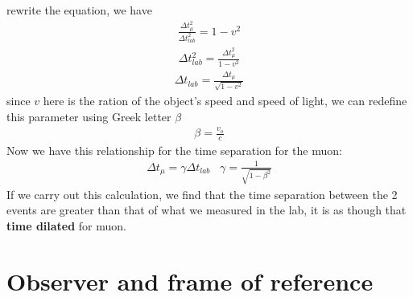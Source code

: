 \documentclass[12pt]{book}
\begin{document}
rewrite the equation, we have
\begin{align}
\frac{\Delta t_\mu^2}{\Delta t_{lab}^2} = 1-v^2
\end{align}
\begin{align}
\Delta t_{lab}^2 = \frac{\Delta t_\mu^2}{1-v^2}
\end{align}
\begin{align}
\Delta t_{lab} = \frac{\Delta t_\mu}{\sqrt{1-v^2}}
\end{align}
since $v$ here is the ration of the object's speed and speed of light, we can redefine this parameter using Greek letter $\beta$
\begin{align}
\beta = \frac{v_o}{c}
\end{align}
Now we have this relationship for the time separation for the muon:
\begin{align}
\Delta t_\mu = \gamma \Delta t_{lab} \;\;\; \gamma = \frac{1}{\sqrt{1-\beta^2}}
\end{align}
\label{time dilation derivation}
If we carry out this calculation, we find that the time separation between the 2 events are greater than that of what we measured in the lab, it is as though that \textbf{time dilated} for muon. 

\section{Observer and frame of reference}
\end{document}
